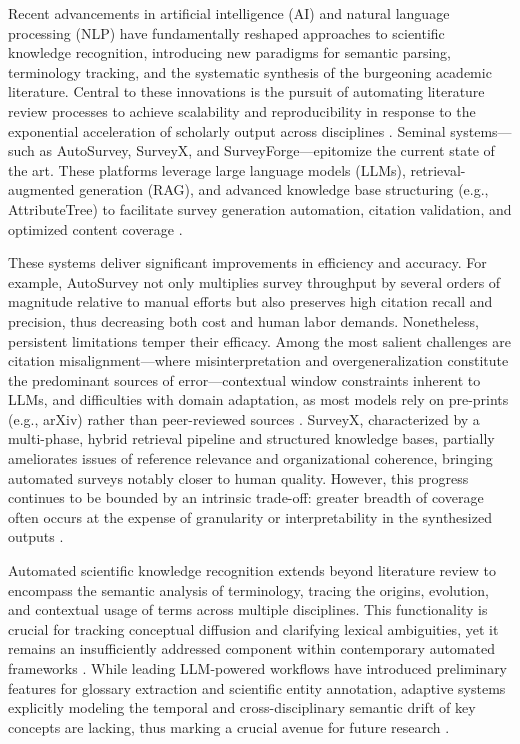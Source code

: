 Recent advancements in artificial intelligence (AI) and natural language processing (NLP) have fundamentally reshaped approaches to scientific knowledge recognition, introducing new paradigms for semantic parsing, terminology tracking, and the systematic synthesis of the burgeoning academic literature. Central to these innovations is the pursuit of automating literature review processes to achieve scalability and reproducibility in response to the exponential acceleration of scholarly output across disciplines \cite{ref111}. Seminal systems—such as AutoSurvey, SurveyX, and SurveyForge—epitomize the current state of the art. These platforms leverage large language models (LLMs), retrieval-augmented generation (RAG), and advanced knowledge base structuring (e.g., AttributeTree) to facilitate survey generation automation, citation validation, and optimized content coverage \cite{ref10,ref11,ref12,ref28,ref29,ref30,ref31,ref35,ref36,ref37,ref38,ref39,ref46,ref47,ref49,ref51,ref62,ref80,ref86,ref88,ref89,ref90,ref91,ref94,ref96,ref97,ref98,ref102,ref108}.

These systems deliver significant improvements in efficiency and accuracy. For example, AutoSurvey not only multiplies survey throughput by several orders of magnitude relative to manual efforts but also preserves high citation recall and precision, thus decreasing both cost and human labor demands. Nonetheless, persistent limitations temper their efficacy. Among the most salient challenges are citation misalignment—where misinterpretation and overgeneralization constitute the predominant sources of error—contextual window constraints inherent to LLMs, and difficulties with domain adaptation, as most models rely on pre-prints (e.g., arXiv) rather than peer-reviewed sources \cite{ref10,ref11,ref12}. SurveyX, characterized by a multi-phase, hybrid retrieval pipeline and structured knowledge bases, partially ameliorates issues of reference relevance and organizational coherence, bringing automated surveys notably closer to human quality. However, this progress continues to be bounded by an intrinsic trade-off: greater breadth of coverage often occurs at the expense of granularity or interpretability in the synthesized outputs \cite{ref11}.

Automated scientific knowledge recognition extends beyond literature review to encompass the semantic analysis of terminology, tracing the origins, evolution, and contextual usage of terms across multiple disciplines. This functionality is crucial for tracking conceptual diffusion and clarifying lexical ambiguities, yet it remains an insufficiently addressed component within contemporary automated frameworks \cite{ref111}. While leading LLM-powered workflows have introduced preliminary features for glossary extraction and scientific entity annotation, adaptive systems explicitly modeling the temporal and cross-disciplinary semantic drift of key concepts are lacking, thus marking a crucial avenue for future research \cite{ref89,ref111}.


